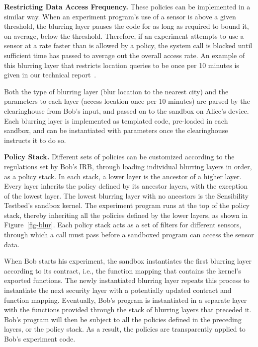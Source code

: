 \textbf{Restricting Data Access Frequency.}
These policies can be implemented in a similar way. When an experiment 
program's use of a sensor is above a given threshold, the blurring layer 
pauses the code for as long as required to bound it, on average, below 
the threshold. Therefore, if an experiment attempts to use a sensor at a 
rate faster than is allowed by a policy, the system call is blocked until 
sufficient time has passed to average out the overall access rate. An example
of this blurring layer that restricts location queries to be once per 10 minutes
is given in our technical report~\cite{zhuangTR15}.

Both the type of blurring layer (blur location to the nearest city) and the 
parameters to each layer (access location once per 10 minutes) are parsed
by the clearinghouse from Bob's input, and passed on to the sandbox on 
Alice's device. Each blurring layer is implemented as templated code, 
pre-loaded in each sandbox, and can be instantiated with parameters 
once the clearinghouse instructs it to do so.

\textbf{Policy Stack.}
Different sets of policies can be customized 
according to the regulations set by Bob's IRB, through loading 
individual blurring layers in order, as a policy stack. In each stack, 
a lower layer is the ancestor of a higher layer. Every layer inherits 
the policy defined by its ancestor layers, with the exception of the lowest layer. 
The lowest blurring layer with no ancestors is the 
Sensibility Testbed's sandbox kernel. The experiment program runs at the top 
of the policy stack, thereby inheriting all the policies defined by the
lower layers, as shown in Figure~\ref{fig-blur}. 
Each policy stack acts as a set of filters for different sensors, through 
which a call must pass before a sandboxed program can
access the sensor data. 

When Bob starts his experiment, the sandbox %
instantiates the first blurring layer according to its contract, i.e., the function 
mapping that contains the kernel's exported functions.
The newly instantiated blurring layer repeats this process 
to instantiate the next security layer with a potentially updated contract and 
function mapping. Eventually, Bob's program is instantiated
in a separate layer with the functions provided
through the stack of blurring layers that preceded it.
Bob's program will then be subject to all the 
policies defined in the preceding layers, or the policy stack. 
As a result,  the policies are transparently applied to Bob's experiment code. 

